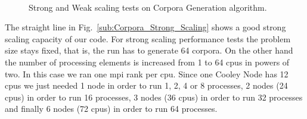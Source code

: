 {\begin{figure}[tb] 
    \centering
    \hfill
\\
    \hfill
	\caption{Strong and Weak scaling tests on Corpora Generation algorithm.}
  \label{fig:Corpora_Scaling} 
\end{figure}

The straight line in Fig.~\ref{sub:Corpora_Strong_Scaling} shows a good strong scaling capacity of our code. For strong scaling performance tests the problem size stays fixed, that is, the run has to generate 64 corpora. On the other hand the number of processing elements is increased from 1 to 64 \glspl{cpu} in powers of two. In this case we ran one \gls{mpi} rank per \gls{cpu}. Since one Cooley Node has 12 \glspl{cpu} we just needed 1 node in order to run 1, 2, 4 or 8 processes, 2 nodes (24 \glspl{cpu}) in order to run 16 processes, 3 nodes (36 \glspl{cpu}) in order to run 32 processes and finally 6 nodes (72 \glspl{cpu}) in order to run 64 processes.

}
